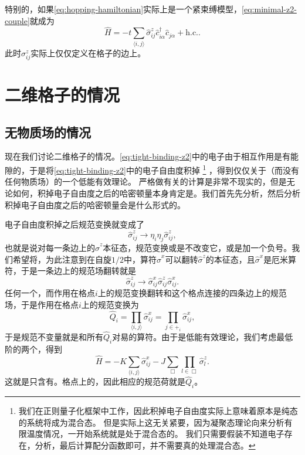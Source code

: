 \documentclass[hyperref, UTF8, a4paper]{ctexart}
\newcommand*{\pair}[1]{\langle #1 \rangle}
\newcommand*{\Ztwo}{$\mathbb{Z}_2$}
\begin{document}
特别的，如果\eqref{eq:hopping-hamiltonian}实际上是一个紧束缚模型，\eqref{eq:minimal-z2-couple}就成为
\begin{equation}
    \hat{H} = - t \sum_{\pair{i, j}} \hat{\sigma}^z_{ij} \hat{c}_{i \alpha}^\dagger \hat{c}_{j \alpha} + \text{h.c.}.
    \label{eq:tight-binding-z2}
\end{equation}
此时$\sigma_{ij}^z$实际上仅仅定义在格子的边上。

\section{二维格子的情况}

\subsection{无物质场的情况}

现在我们讨论二维格子的情况。\eqref{eq:tight-binding-z2}中的电子由于相互作用是有能隙的，于是将\eqref{eq:tight-binding-z2}中的电子自由度积掉%
\footnote{我们在正则量子化框架中工作，因此积掉电子自由度实际上意味着原本是纯态的系统将成为混合态。
但是实际上这无关紧要，因为凝聚态理论向来分析有限温度情况，一开始系统就是处于混合态的。
我们只需要假装不知道电子存在，分析，最后计算配分函数即可，并不需要真的处理混合态。}%
，得到仅仅关于（而没有任何物质场）的一个低能有效理论。
严格做有关的计算是非常不现实的，但是无论如何，积掉电子自由度之后的哈密顿量本身肯定是。我们首先先分析，然后分析积掉电子自由度之后的哈密顿量会是什么形式的。

电子自由度积掉之后规范变换就变成了
\[
    \hat{\sigma}_{ij}^z \longrightarrow \eta_i \eta_j \hat{\sigma}_{ij}^z,
\]
也就是说对每一条边上的$\hat{\sigma}^z$本征态，规范变换或是不改变它，或是加一个负号。我们希望将，为此注意到在自旋$1/2$中，算符$\hat{\sigma}^x$可以翻转$\hat{\sigma}^z$的本征态，且$\hat{\sigma}^x$是厄米算符，于是一条边上的规范场翻转就是
\[
    \hat{\sigma}_{ij}^z \longrightarrow \hat{\sigma}^x_{ij} \hat{\sigma}_{ij}^z \hat{\sigma}^x_{ij}.
\]
任何一个，而作用在格点$i$上的规范变换翻转和这个格点连接的四条边上的规范场，于是作用在格点$i$上的规范变换为
\begin{equation}
    \hat{Q}_i = \prod_{\pair{i, j}} \hat{\sigma}^x_{ij} = \prod_{j \in +_i} \hat{\sigma}^x_{ij},
\end{equation}
于是规范不变量就是和所有$\hat{Q}_i$对易的算符。由于是低能有效理论，我们考虑最低阶的两个，得到
\begin{equation}
    \hat{H} = - K \sum_{\pair{i, j}} \hat{\sigma}^x_{ij} - J \sum_{\Box} \prod_{l \in \Box} \hat{\sigma}^z_{l}.
    \label{eq:z2-2d-hamiltonian}
\end{equation}
这就是只含有。格点上的，因此相应的规范荷就是$\hat{Q}_i$。
\end{document}
